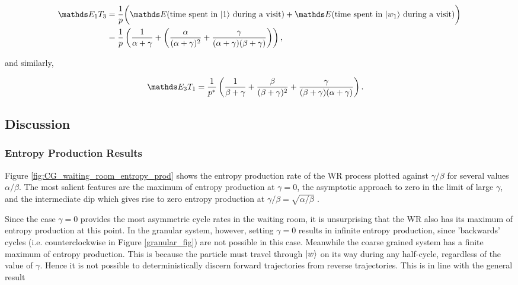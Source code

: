 \begin{align}
\begin{split} 
\bE_1T_3 &= \frac{1}{p} \bigg( \bE(\text{time spent in $\ket{1}$ during a visit}) + \bE (\text{time spent in $\ket{w_1}$ during a visit})\bigg)\\
&= \frac{1}{p}\left(\frac{1}{\alpha + \gamma} + \left (\frac{\alpha}{(\alpha +\gamma)^2} + \frac{\gamma}{(\alpha + \gamma)(\beta + \gamma)} \right)\right),
\end{split}
\end{align}

and similarly,

\begin{align}
\bE_3T_1 &= \frac{1}{p^\ast}\left(\frac{1}{\beta + \gamma} + \frac{\beta}{(\beta +\gamma)^2} + \frac{\gamma}{(\beta + \gamma)(\alpha + \gamma)} \right).
\end{align}

\subsection{Discussion}

\subsubsection{Entropy Production Results}

Figure \ref{fig:CG_waiting_room_entropy_prod} shows the entropy production rate of the WR process plotted against $\gamma/\beta$ for several values $\alpha/\beta$. The most salient features are the  maximum of entropy production at $\gamma = 0$, the asymptotic approach to zero in the limit of large $\gamma$, and the intermediate dip which gives rise to zero entropy production at $\gamma/\beta = \sqrt{\alpha/\beta}$ . 

Since the case $\gamma = 0$ provides the most asymmetric cycle rates in the waiting room, it is unsurprising that the WR also has its maximum of entropy production at this point. In the granular system, however, setting $\gamma = 0$ results in infinite entropy production, since 'backwards' cycles (i.e. counterclockwise in Figure \ref{granular_fig}) are not possible in this case. Meanwhile the coarse grained system has a finite maximum of entropy production. This is because the particle must travel through $\ket{w}$ on its way during any half-cycle, regardless of the value of $\gamma$. Hence it is not possible to deterministically discern forward trajectories from reverse trajectories. This is in line with the general result \cite{maes2003time,}

